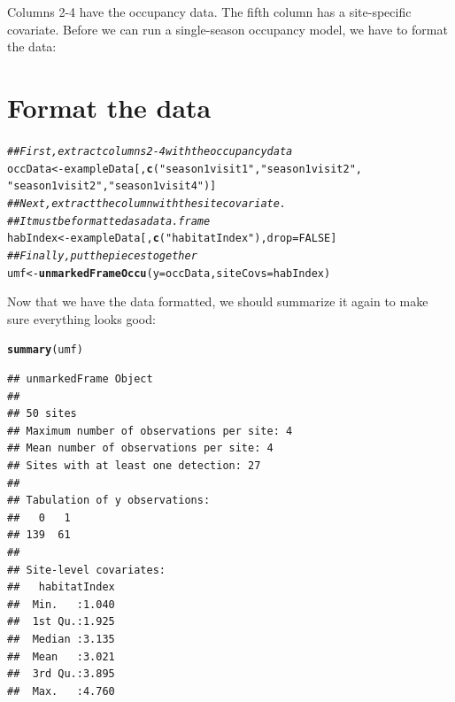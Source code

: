 \documentclass[12pt]{article}\usepackage[]{graphicx}\usepackage[]{color}
\makeatletter
\newcommand{\hlnum}[1]{\textcolor[rgb]{0.686,0.059,0.569}{#1}}%
\newcommand{\hlstr}[1]{\textcolor[rgb]{0.192,0.494,0.8}{#1}}%
\newcommand{\hlcom}[1]{\textcolor[rgb]{0.678,0.584,0.686}{\textit{#1}}}%
\newcommand{\hlstd}[1]{\textcolor[rgb]{0.345,0.345,0.345}{#1}}%
\newcommand{\hlkwb}[1]{\textcolor[rgb]{0.69,0.353,0.396}{#1}}%
\newcommand{\hlkwc}[1]{\textcolor[rgb]{0.333,0.667,0.333}{#1}}%
\newcommand{\hlkwd}[1]{\textcolor[rgb]{0.737,0.353,0.396}{\textbf{#1}}}%
\newenvironment{kframe}{%
 \def\at@end@of@kframe{}%
 \ifinner\ifhmode%
  \def\at@end@of@kframe{\end{minipage}}%
  \begin{minipage}{\columnwidth}%
 \fi\fi%
 \def\FrameCommand##1{\hskip\@totalleftmargin \hskip-\fboxsep
 \colorbox{shadecolor}{##1}\hskip-\fboxsep
     \hskip-\linewidth \hskip-\@totalleftmargin \hskip\columnwidth}%
 \MakeFramed {\advance\hsize-\width
   \@totalleftmargin\z@ \linewidth\hsize
   \@setminipage}}%
 {\par\unskip\endMakeFramed%
 \at@end@of@kframe}
\newenvironment{knitrout}{}{} %
\makeatother
\begin{document}
Columns 2-4 have the occupancy data. The fifth column has a site-specific covariate. Before we can run a single-season occupancy model, we have to format the data:


\section*{Format the data}



\begin{knitrout}
\color{fgcolor}\begin{kframe}
\begin{alltt}
\hlcom{## First, extract columns 2-4 with the occupancy data}
\hlstd{occData} \hlkwb{<-} \hlstd{exampleData[,}\hlkwd{c}\hlstd{(}\hlstr{"season1visit1"}\hlstd{,} \hlstr{"season1visit2"}\hlstd{,}
                          \hlstr{"season1visit2"}\hlstd{,} \hlstr{"season1visit4"}\hlstd{)]}
\hlcom{## Next, extract the column with the site covariate.}
\hlcom{## It must be formatted as a data.frame}
\hlstd{habIndex} \hlkwb{<-} \hlstd{exampleData[,}\hlkwd{c}\hlstd{(}\hlstr{"habitatIndex"}\hlstd{),}\hlkwc{drop}\hlstd{=}\hlnum{FALSE}\hlstd{]}
\hlcom{## Finally, put the pieces together}
\hlstd{umf} \hlkwb{<-} \hlkwd{unmarkedFrameOccu}\hlstd{(}\hlkwc{y}\hlstd{=occData,} \hlkwc{siteCovs}\hlstd{=habIndex)}
\end{alltt}
\end{kframe}
\end{knitrout}


Now that we have the data formatted, we should summarize it again to make sure everything looks good:

\begin{knitrout}
\color{fgcolor}\begin{kframe}
\begin{alltt}
\hlkwd{summary}\hlstd{(umf)}
\end{alltt}
\begin{verbatim}
## unmarkedFrame Object
## 
## 50 sites
## Maximum number of observations per site: 4 
## Mean number of observations per site: 4 
## Sites with at least one detection: 27 
## 
## Tabulation of y observations:
##   0   1 
## 139  61 
## 
## Site-level covariates:
##   habitatIndex  
##  Min.   :1.040  
##  1st Qu.:1.925  
##  Median :3.135  
##  Mean   :3.021  
##  3rd Qu.:3.895  
##  Max.   :4.760
\end{verbatim}
\end{kframe}
\end{knitrout}
\end{document}

